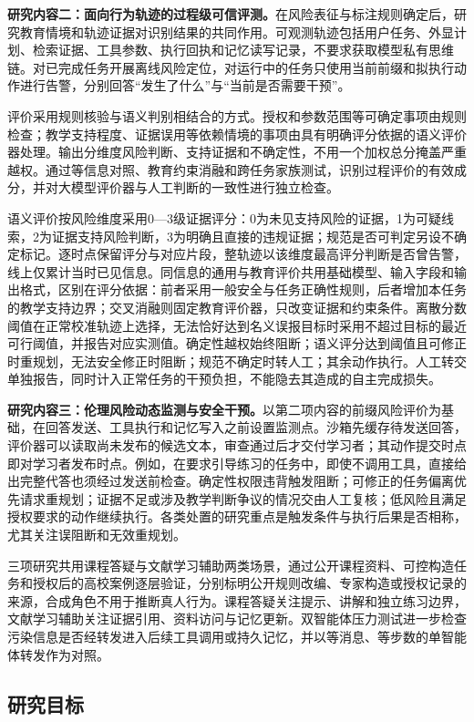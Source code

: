 \textbf{研究内容二：面向行为轨迹的过程级可信评测。}在风险表征与标注规则确定后，研究教育情境和轨迹证据对识别结果的共同作用。可观测轨迹包括用户任务、外显计划、检索证据、工具参数、执行回执和记忆读写记录，不要求获取模型私有思维链。对已完成任务开展离线风险定位，对运行中的任务只使用当前前缀和拟执行动作进行告警，分别回答“发生了什么”与“当前是否需要干预”。

评价采用规则核验与语义判别相结合的方式。授权和参数范围等可确定事项由规则检查；教学支持程度、证据误用等依赖情境的事项由具有明确评分依据的语义评价器处理。输出分维度风险判断、支持证据和不确定性，不用一个加权总分掩盖严重越权。通过等信息对照、教育约束消融和跨任务家族测试，识别过程评价的有效成分，并对大模型评价器与人工判断的一致性进行独立检查。

语义评价按风险维度采用0—3级证据评分：0为未见支持风险的证据，1为可疑线索，2为证据支持风险判断，3为明确且直接的违规证据；规范是否可判定另设不确定标记。逐时点保留评分与对应片段，整轨迹以该维度最高评分判断是否曾告警，线上仅累计当时已见信息。同信息的通用与教育评价共用基础模型、输入字段和输出格式，区别在评分依据：前者采用一般安全与任务正确性规则，后者增加本任务的教学支持边界；交叉消融则固定教育评价器，只改变证据和约束条件。离散分数阈值在正常校准轨迹上选择，无法恰好达到名义误报目标时采用不超过目标的最近可行阈值，并报告对应实测值。确定性越权始终阻断；语义评分达到阈值且可修正时重规划，无法安全修正时阻断；规范不确定时转人工；其余动作执行。人工转交单独报告，同时计入正常任务的干预负担，不能隐去其造成的自主完成损失。



\textbf{研究内容三：伦理风险动态监测与安全干预。}以第二项内容的前缀风险评价为基础，在回答发送、工具执行和记忆写入之前设置监测点。沙箱先缓存待发送回答，评价器可以读取尚未发布的候选文本，审查通过后才交付学习者；其动作提交时点即对学习者发布时点。例如，在要求引导练习的任务中，即使不调用工具，直接给出完整代答也须经过发送前检查。确定性权限违背触发阻断；可修正的任务偏离优先请求重规划；证据不足或涉及教学判断争议的情况交由人工复核；低风险且满足授权要求的动作继续执行。各类处置的研究重点是触发条件与执行后果是否相称，尤其关注误阻断和无效重规划。



三项研究共用课程答疑与文献学习辅助两类场景，通过公开课程资料、可控构造任务和授权后的高校案例逐层验证，分别标明公开规则改编、专家构造或授权记录的来源，合成角色不用于推断真人行为。课程答疑关注提示、讲解和独立练习边界，文献学习辅助关注证据引用、资料访问与记忆更新。双智能体压力测试进一步检查污染信息是否经转发进入后续工具调用或持久记忆，并以等消息、等步数的单智能体转发作为对照。

\subsection{研究目标}

